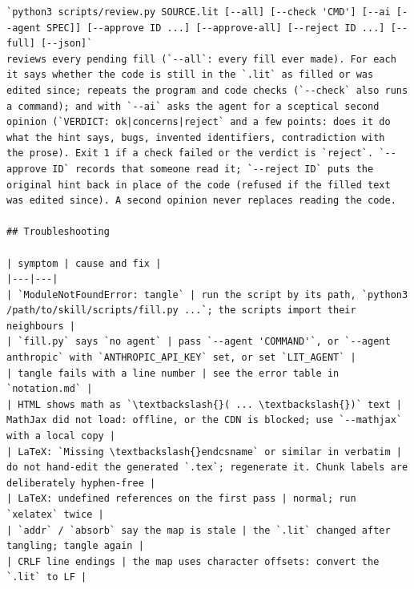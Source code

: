 \documentclass[10pt,a4paper]{article}
\begin{document}
\begin{Verbatim}
`python3 scripts/review.py SOURCE.lit [--all] [--check 'CMD'] [--ai [--agent SPEC]] [--approve ID ...] [--approve-all] [--reject ID ...] [--full] [--json]`
reviews every pending fill (`--all`: every fill ever made). For each it says whether the code is still in the `.lit` as filled or was
edited since; repeats the program and code checks (`--check` also runs a command); and with `--ai` asks the agent for a sceptical second
opinion (`VERDICT: ok|concerns|reject` and a few points: does it do what the hint says, bugs, invented identifiers, contradiction with
the prose). Exit 1 if a check failed or the verdict is `reject`. `--approve ID` records that someone read it; `--reject ID` puts the
original hint back in place of the code (refused if the filled text was edited since). A second opinion never replaces reading the code.

## Troubleshooting

| symptom | cause and fix |
|---|---|
| `ModuleNotFoundError: tangle` | run the script by its path, `python3 /path/to/skill/scripts/fill.py ...`; the scripts import their neighbours |
| `fill.py` says `no agent` | pass `--agent 'COMMAND'`, or `--agent anthropic` with `ANTHROPIC_API_KEY` set, or set `LIT_AGENT` |
| tangle fails with a line number | see the error table in `notation.md` |
| HTML shows math as `\textbackslash{}( ... \textbackslash{})` text | MathJax did not load: offline, or the CDN is blocked; use `--mathjax` with a local copy |
| LaTeX: `Missing \textbackslash{}endcsname` or similar in verbatim | do not hand-edit the generated `.tex`; regenerate it. Chunk labels are deliberately hyphen-free |
| LaTeX: undefined references on the first pass | normal; run `xelatex` twice |
| `addr` / `absorb` say the map is stale | the `.lit` changed after tangling; tangle again |
| CRLF line endings | the map uses character offsets: convert the `.lit` to LF |
\end{Verbatim}
\end{document}
